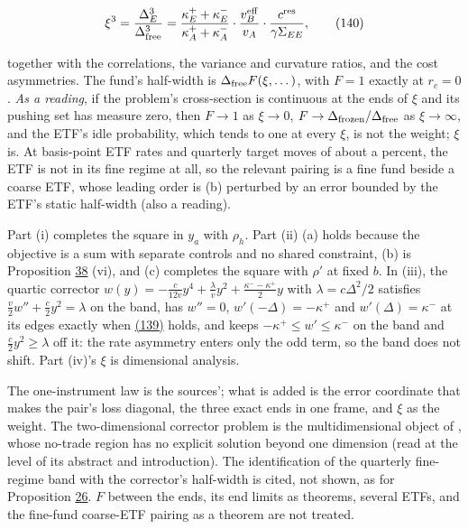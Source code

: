 \documentclass[11pt]{article}
\begin{document}
\begin{equation*}
\xi^3=\frac{\Delta_E^3}{\Delta_{\rm free}^3}
=\frac{\kappa^+_E+\kappa^-_E}{\kappa^+_A+\kappa^-_A}\cdot\frac{v_B^{\rm eff}}{v_A}\cdot\frac{c^{\rm res}}{\gamma\Sigma_{EE}},\tag{140}\label{eq:140}
\end{equation*}

together with the correlations, the variance and curvature ratios, and
the cost asymmetries. The fund's half-width is \(\Delta_{\rm free}F(\xi,\dots)\), with
\(F=1\) exactly at \(r_c=0\). \emph{As a reading}, if the problem's cross-section is
continuous at the ends of \(\xi\) and its pushing set has measure zero,
then \(F\to1\) as \(\xi\to0\), \(F\to\Delta_{\rm frozen}/\Delta_{\rm free}\) as \(\xi\to\infty\), and the ETF's
idle probability, which tends to one at every \(\xi\), is not the weight;
\(\xi\) is. At basis-point ETF rates and quarterly target moves of about a
percent, the ETF is not in its fine regime at all, so the relevant
pairing is a fine fund beside a coarse ETF, whose leading order is (b)
perturbed by an error bounded by the ETF's static half-width (also a
reading).

Part (i) completes the square in \(y_a\) with \(\rho_h\). Part (ii) (a) holds
because the objective is a sum with separate controls and no shared
constraint, (b) is Proposition \hyperref[res:Proposition-38]{38} (vi), and (c) completes the square
with \(\rho'\) at fixed \(b\). In (iii), the quartic corrector
\(w(y)=-\frac c{12v}y^4+\frac{\lambda}vy^2+\frac{\kappa^--\kappa^+}2y\) with \(\lambda=c\Delta^2/2\) satisfies
\(\frac v2w''+\frac c2y^2=\lambda\) on the band, has \(w''=0\), \(w'(-\Delta)=-\kappa^+\) and \(w'(\Delta)=\kappa^-\) at its
edges exactly when \hyperref[eq:139]{(139)} holds, and keeps \(-\kappa^+\leq w'\leq\kappa^-\) on the band and
\(\frac c2y^2\geq\lambda\) off it: the rate asymmetry enters only the odd term, so
the band does not shift. Part (iv)'s \(\xi\) is dimensional analysis.

The one-instrument law is the sources'; what is added is the error
coordinate that makes the pair's loss diagonal, the three exact ends
in one frame, and \(\xi\) as the weight. The two-dimensional corrector
problem is the multidimensional object of \cite{possamai2015homogenization},
whose no-trade region has no explicit solution beyond one dimension
(read at the level of its abstract and introduction). The identification of the
quarterly fine-regime band with the corrector's half-width is cited,
not shown, as for Proposition \hyperref[res:Proposition-26]{26}. \(F\) between the ends, its end limits
as theorems, several ETFs, and the fine-fund coarse-ETF pairing as a
theorem are not treated.
\end{document}

